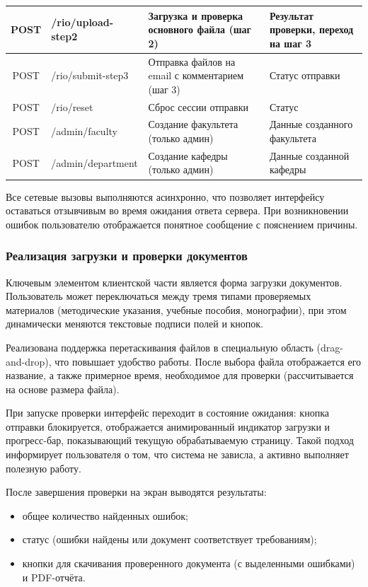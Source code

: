 \begin{xltabular}{\textwidth}{|c|X|X|X|}
	POST & /rio/upload-step2 & Загрузка и проверка основного файла (шаг 2) & Результат проверки, переход на шаг 3 \\ \hline
	POST & /rio/submit-step3 & Отправка файлов на email с комментарием (шаг 3) & Статус отправки \\ \hline
	POST & /rio/reset & Сброс сессии отправки & Статус \\ \hline
	POST & /admin/faculty & Создание факультета (только админ) & Данные созданного факультета \\ \hline
	POST & /admin/department & Создание кафедры (только админ) & Данные созданной кафедры \\ \hline
\end{xltabular}

Все сетевые вызовы выполняются асинхронно, что позволяет интерфейсу оставаться отзывчивым во время ожидания ответа сервера. При возникновении ошибок пользователю отображается понятное сообщение с пояснением причины.

\subsubsection{Реализация загрузки и проверки документов}

Ключевым элементом клиентской части является форма загрузки документов. Пользователь может переключаться между тремя типами проверяемых материалов (методические указания, учебные пособия, монографии), при этом динамически меняются текстовые подписи полей и кнопок.

Реализована поддержка перетаскивания файлов в специальную область (drag-and-drop), что повышает удобство работы. После выбора файла отображается его название, а также примерное время, необходимое для проверки (рассчитывается на основе размера файла).

При запуске проверки интерфейс переходит в состояние ожидания: кнопка отправки блокируется, отображается анимированный индикатор загрузки и прогресс-бар, показывающий текущую обрабатываемую страницу. Такой подход информирует пользователя о том, что система не зависла, а активно выполняет полезную работу.

После завершения проверки на экран выводятся результаты:

\begin{itemize}
	\item общее количество найденных ошибок;
	\item статус (ошибки найдены или документ соответствует требованиям);
	\item кнопки для скачивания проверенного документа (с выделенными ошибками) и PDF-отчёта.
\end{itemize}

